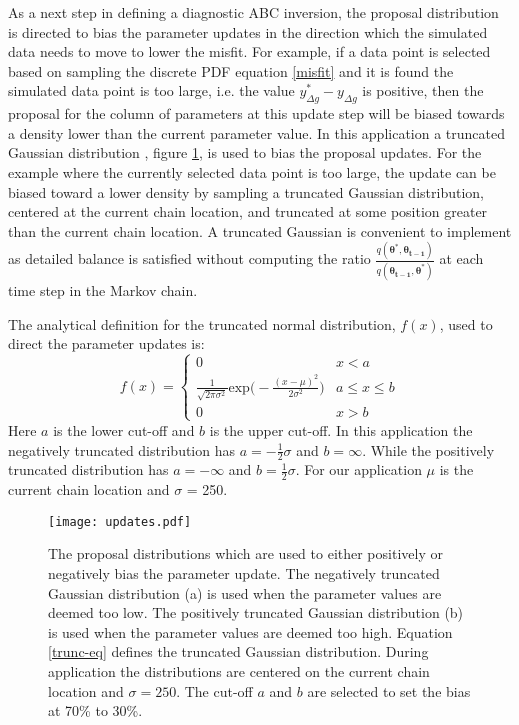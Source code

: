 As a next step in defining a diagnostic ABC inversion, the proposal distribution is directed to bias the parameter updates in the direction which the simulated data needs to move to lower the misfit. For example, if a data point is selected based on sampling the discrete PDF equation \ref{misfit} and it is found the simulated data point is too large, i.e. the value $y^*_{\Delta g} - y_{\Delta g}$ is positive, then the proposal for the column of parameters at this update step will be biased towards a density lower than the current parameter value. In this application a truncated Gaussian distribution , figure \ref{updates}, is used to bias the proposal updates. For the example where the currently selected data point is too large, the update can be biased toward a lower density by sampling a truncated Gaussian distribution, centered at the current chain location, and truncated at some position greater than the current chain location. A truncated Gaussian is convenient to implement as detailed balance is satisfied without computing the ratio $\frac{q(\bm{\theta^*},\bm{\theta_{t-1}})}{q(\bm{\theta_{t-1}},\bm{\theta^*})}$ at each time step in the Markov chain. \par

The analytical definition for the truncated normal distribution, $f(x)$, used to direct the parameter updates is:
\begin{equation}
f(x) = \begin{cases} 
0 & x < a \\
\frac{1}{\sqrt{2\pi\sigma^2}}\text{exp}\Big(-\frac{(x-\mu)^2}{2\sigma^2}\Big) & a\leq x\leq b \\
0 & x > b 
\end{cases}
\label{trunc-eq}
\end{equation}
Here $a$ is the lower cut-off and $b$ is the upper cut-off. In this application the negatively truncated distribution has $a = -\frac{1}{2}\sigma$ and $b = \infty$. While the positively truncated distribution has $a = -\infty$ and $b = \frac{1}{2}\sigma$. For our application $\mu$ is the current chain location and $\sigma$ = 250. \par

\begin{figure}[H]
	\centering
	\texttt{[image: updates.pdf]}
	\caption{The proposal distributions which are used to either positively or negatively bias the parameter update. The negatively truncated Gaussian distribution (a) is used when the parameter values are deemed too low. The positively truncated Gaussian distribution (b) is used when the parameter values are deemed too high. Equation \ref{trunc-eq} defines the truncated Gaussian distribution. During application the distributions are centered on the current chain location and $\sigma = 250$. The cut-off $a$ and $b$ are selected to set the bias at 70\% to 30\%.} 
	\label{updates}
\end{figure}


